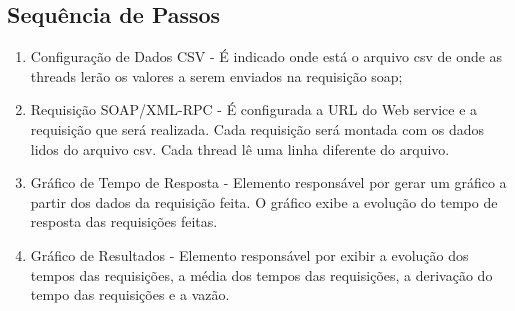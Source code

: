 \subsection{Sequência de Passos}

\begin{enumerate}
\item Configuração de Dados CSV - É indicado onde está o arquivo csv de onde as threads lerão os valores a serem enviados na requisição soap;
\item Requisição SOAP/XML-RPC - É configurada a URL do Web service e a requisição que será realizada. Cada requisição será montada com os dados lidos do arquivo csv. Cada thread lê uma linha diferente do arquivo.
\item Gráfico de Tempo de Resposta -  Elemento responsável por gerar um gráfico a partir dos dados da requisição feita. O gráfico exibe a  evolução do tempo de resposta das requisições feitas.
\item Gráfico de Resultados - Elemento responsável por exibir a evolução dos tempos das requisições, a média dos tempos das requisições, a derivação do tempo das requisições e a vazão.
\end{enumerate}



